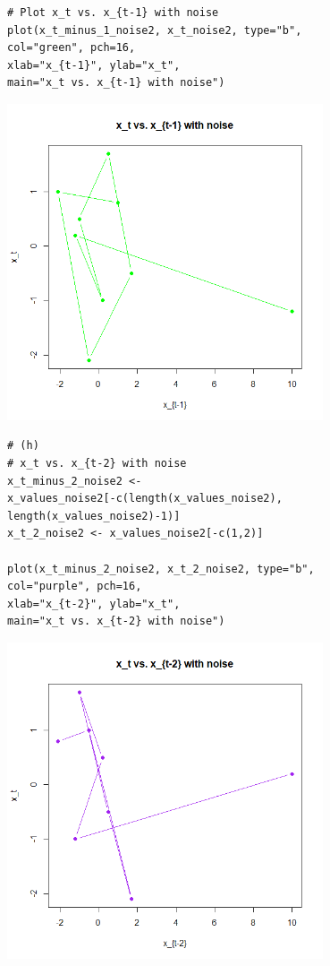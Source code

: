 \documentclass[12pt]{article}
\begin{document}
\begin{enumerate}
\begin{enumerate}
\begin{verbatim}
# Plot x_t vs. x_{t-1} with noise
plot(x_t_minus_1_noise2, x_t_noise2, type="b",
col="green", pch=16,
xlab="x_{t-1}", ylab="x_t",
main="x_t vs. x_{t-1} with noise")
\end{verbatim}
        \begin{center}
            \includegraphics[width=0.7\textwidth]{Rplot14.png}
        \end{center}
\begin{verbatim}
# (h)
# x_t vs. x_{t-2} with noise
x_t_minus_2_noise2 <-
x_values_noise2[-c(length(x_values_noise2),
length(x_values_noise2)-1)]
x_t_2_noise2 <- x_values_noise2[-c(1,2)]

plot(x_t_minus_2_noise2, x_t_2_noise2, type="b",
col="purple", pch=16,
xlab="x_{t-2}", ylab="x_t",
main="x_t vs. x_{t-2} with noise")
\end{verbatim}
        \begin{center}
            \includegraphics[width=0.7\textwidth]{Rplot15.png}
        \end{center}
    \end{enumerate}


\end{enumerate}
\end{document}
